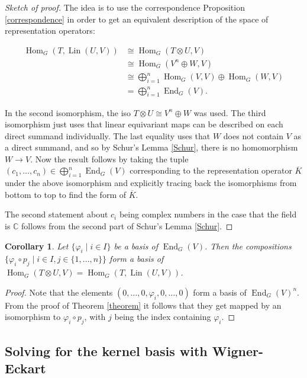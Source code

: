 \documentclass[12pt, a4paper]{article}
\theoremstyle{plain}
\newtheorem{cor}[pro]{Corollary}
\theoremstyle{definition}
\theoremstyle{remark}
\newcommand{\C}{\mathds{C}}
\DeclareMathOperator{\lin}{Lin}
\DeclareMathOperator{\End}{End}
\DeclareMathOperator{\Hom}{Hom}
\begin{document}
\begin{proof}[Sketch of proof]
The idea is to use the correspondence Proposition \ref{correspondence} in order to get an equivalent description of the space of representation operators:

\begin{align*}
\Hom_G(T, \lin(U, V)) & \cong \Hom_G(T \otimes U, V) \\
& \cong \Hom_G(V^n \oplus W, V) \\
& \cong \bigoplus_{i = 1}^{n} \Hom_G(V, V) \oplus \Hom_G(W, V) \\
& = \bigoplus_{i = 1}^{n} \End_G(V).
\end{align*}

In the second isomorphism, the iso $T \otimes U \cong V^n \oplus W$ was used. The third isomorphism just uses that linear equivariant maps can be described on each direct summand individually. The last equality uses that $W$ does not contain $V$ as a direct summand, and so by Schur's Lemma \ref{Schur}, there is no homomorphism $W \to V$. Now the result follows by taking the tuple $(c_1, \dots, c_n) \in \bigoplus_{i = 1}^{n} \End_G(V)$ corresponding to the representation operator $\overline{K}$ under the above isomorphism and explicitly tracing back the isomorphisms from bottom to top to find the form of $\overline{K}$.

The second statement about $c_i$ being complex numbers in the case that the field is $\C$ follows from the second part of Schur's Lemma \ref{Schur}.
\end{proof}

\begin{cor}\label{corollary}
Let $\{ \varphi_i \mid i \in I \}$ be a basis of $\End_G(V)$. Then the compositions $\{ \varphi_i \circ p_j \mid i \in I, j \in \{1, \dots, n\} \}$ form a basis of $\Hom_G(T \otimes U, V) = \Hom_G(T, \lin(U, V))$.
\end{cor}

\begin{proof}
Note that the elements $(0, \dots, 0, \varphi_i, 0, \dots, 0)$ form a basis of $\End_G(V)^n$. From the proof of Theorem \ref{theorem} it follows that they get mapped by an isomorphism to $\varphi_i \circ p_j$, with $j$ being the index containing $\varphi_i$.
\end{proof}


\subsection{Solving for the kernel basis with Wigner-Eckart}\label{solution_harmonic_networks}
\end{document}

